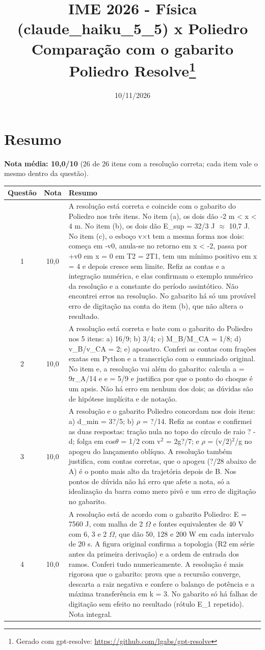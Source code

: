 \documentclass{article}%
\title{IME 2026 {-} Física (claude\_haiku\_5\_5) x Poliedro\\[4pt]\large Comparação com o gabarito Poliedro Resolve\thanks{Gerado com gpt-resolve: \url{https://github.com/lgabs/gpt-resolve}}}%
\date{10/11/2026}%
\begin{document}
%
\normalsize%
\maketitle%
\section*{Resumo}\textbf{Nota média: 10,0/10} (26 de 26 itens com a resolução correta; cada item vale o mesmo dentro da questão).\par\medskip%
\begin{longtable}{@{}c c p{}@{}}\toprule Questão & Nota & Resumo \\ \midrule
1 & 10,0 & A resolução está correta e coincide com o gabarito do Poliedro nos três itens. No item (a), os dois dão {-}2 m < x < 4 m. No item (b), os dois dão E\_sup = 32/3 J $\approx$ 10,7 J. No item (c), o esboço v$\times$t tem a mesma forma nos dois: começa em {-}v0, anula{-}se no retorno em x < {-}2, passa por +v0 em x = 0 em T2 = 2T1, tem um mínimo positivo em x = 4 e depois cresce sem limite. Refiz as contas e a integração numérica, e elas confirmam o exemplo numérico da resolução e a constante do período assintótico. Não encontrei erros na resolução. No gabarito há só um provável erro de digitação na conta do item (b), que não altera o resultado. \\
2 & 10,0 & A resolução está correta e bate com o gabarito do Poliedro nos 5 itens: a) 16/9; b) 3/4; c) M\_B/M\_CA = 1/8; d) v\_B/v\_CA = 2; e) apoastro. Conferi as contas com frações exatas em Python e a transcrição com o enunciado original. No item e, a resolução vai além do gabarito: calcula a = 9r\_A/14 e e = 5/9 e justifica por que o ponto do choque é um apsis. Não há erro em nenhum dos dois; as dúvidas são de hipótese implícita e de notação. \\
3 & 10,0 & A resolução e o gabarito Poliedro concordam nos dois itens: a) d\_min = 3?/5; b) $\rho$ = ?/14. Refiz as contas e confirmei as duas respostas: tração nula no topo do círculo de raio ? - d; folga em cos$\theta$ = 1/2 com v$^2$ = 2g?/7; e $\rho$ = (v/2)$^2$/g no apogeu do lançamento oblíquo. A resolução também justifica, com contas corretas, que o apogeu (?/28 abaixo de A) é o ponto mais alto da trajetória depois de B. Nos pontos de dúvida não há erro que afete a nota, só a idealização da barra como mero pivô e um erro de digitação no gabarito. \\
4 & 10,0 & A resolução está de acordo com o gabarito Poliedro: E = 7560 J, com malha de 2 $\Omega$ e fontes equivalentes de 40 V com 6, 3 e 2 $\Omega$, que dão 50, 128 e 200 W em cada intervalo de 20 s. A figura original confirma a topologia (R2 em série antes da primeira derivação) e a ordem de entrada dos ramos. Conferi tudo numericamente. A resolução é mais rigorosa que o gabarito: prova que a recursão converge, descarta a raiz negativa e confere o balanço de potência e a máxima transferência em k = 3. No gabarito só há falhas de digitação sem efeito no resultado (rótulo E\_1 repetido). Nota integral. \\

\end{longtable}
\end{document}
